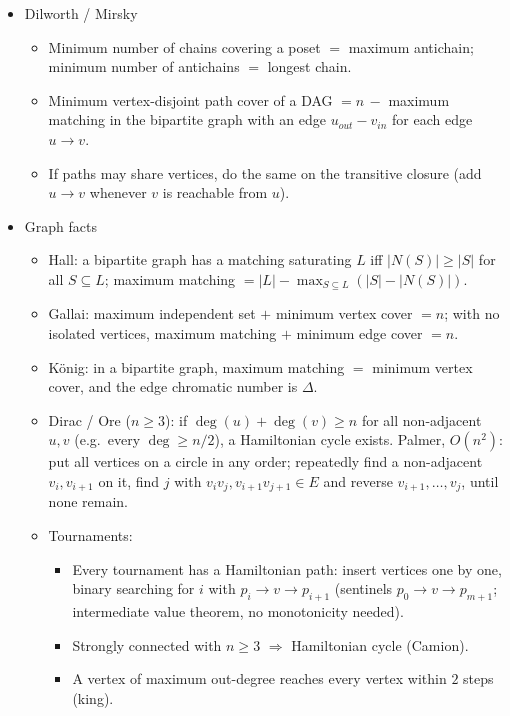 \begin{itemize}
\item Dilworth / Mirsky

\begin{itemize}
  \item Minimum number of chains covering a poset $=$ maximum antichain; minimum number of antichains $=$ longest chain.
  \item Minimum vertex-disjoint path cover of a DAG $= n\, -$ maximum matching in the bipartite graph with an edge $u_{out} - v_{in}$ for each edge $u \to v$.
  \item If paths may share vertices, do the same on the transitive closure (add $u \to v$ whenever $v$ is reachable from $u$).
\end{itemize}

\item Graph facts

\begin{itemize}
  \item Hall: a bipartite graph has a matching saturating $L$ iff $|N(S)| \ge |S|$ for all $S \subseteq L$; maximum matching $= |L| - \max_{S \subseteq L} (|S| - |N(S)|)$.
  \item Gallai: maximum independent set $+$ minimum vertex cover $= n$; with no isolated vertices, maximum matching $+$ minimum edge cover $= n$.
  \item König: in a bipartite graph, maximum matching $=$ minimum vertex cover, and the edge chromatic number is $\Delta$.
  \item Dirac / Ore ($n \ge 3$): if $\deg(u) + \deg(v) \ge n$ for all non-adjacent $u, v$ (e.g.\ every $\deg \ge n/2$), a Hamiltonian cycle exists. Palmer, $O(n^2)$: put all vertices on a circle in any order; repeatedly find a non-adjacent $v_i, v_{i+1}$ on it, find $j$ with $v_i v_j, v_{i+1} v_{j+1} \in E$ and reverse $v_{i+1}, \ldots, v_j$, until none remain.
  \item Tournaments:
  \begin{itemize}
    \item Every tournament has a Hamiltonian path: insert vertices one by one, binary searching for $i$ with $p_i \to v \to p_{i+1}$ (sentinels $p_0 \to v \to p_{m+1}$; intermediate value theorem, no monotonicity needed).
    \item Strongly connected with $n \ge 3$ $\Rightarrow$ Hamiltonian cycle (Camion).
    \item A vertex of maximum out-degree reaches every vertex within $2$ steps (king).
  \end{itemize}
\end{itemize}


\end{itemize}
